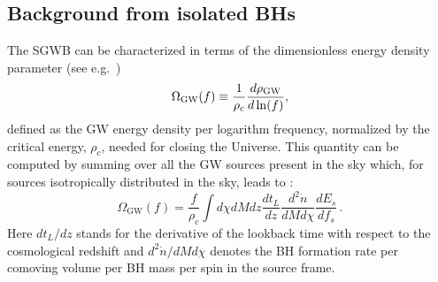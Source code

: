 \documentclass[
reprint,           %
superscriptaddress,%
amsmath,           %
amssymb,           %
aps,               %
prd,               %
notitlepage,       %
floatfix,          %
nofootinbib %
]{revtex4-1}
\def\e{\begin{equation}}
\def\q{\end{equation}}
\begin{document}
\subsection{Background from isolated BHs}

The SGWB can be characterized in terms of the dimensionless energy density parameter (see e.g.~\cite{Maggiore:1900zz})
\e
\Omega_{\mathrm{GW}}(f)\equiv {1\over \rho_c}\frac{d\rho_{\mathrm{GW}}}{d \ln(f)},
\q
defined as the GW energy density per logarithm frequency, normalized by the critical energy, $\rho_c$, needed for closing the Universe. This quantity can be computed by summing over all the GW sources present in the sky which, for sources isotropically distributed in the sky, leads to \cite{Phinney:2001di}:
\e
\Omega_{\mathrm{GW}}(f)=\frac{f}{\rho_{c}} \int d \chi d M d z \frac{d t_L}{d z} \frac{d^{2} \dot{n}}{d M d \chi} \frac{d E_{s}}{d f_{s}}\,.
\q
Here $d t_L/dz$ stands for the derivative of the lookback time with respect to the cosmological redshift and ${d^{2} \dot{n}}/{d M d \chi}$ denotes the BH formation rate per comoving volume per BH mass per spin in the source frame.
\end{document}
